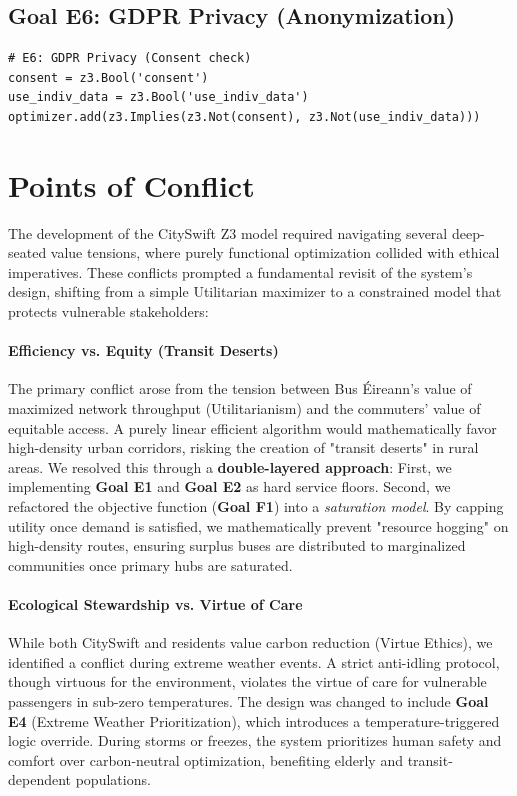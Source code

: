 \documentclass[]
{UCD_CS_41820_Report}
\begin{document}
\subsection{Goal E6: GDPR Privacy (Anonymization)}
\begin{lstlisting}[style=py]
# E6: GDPR Privacy (Consent check)
consent = z3.Bool('consent')
use_indiv_data = z3.Bool('use_indiv_data')
optimizer.add(z3.Implies(z3.Not(consent), z3.Not(use_indiv_data)))
\end{lstlisting}

\section{Points of Conflict}
The development of the CitySwift Z3 model required navigating several deep-seated value tensions, where purely functional optimization collided with ethical imperatives. These conflicts prompted a fundamental revisit of the system's design, shifting from a simple Utilitarian maximizer to a constrained model that protects vulnerable stakeholders:

\paragraph{Efficiency vs. Equity (Transit Deserts)}
The primary conflict arose from the tension between Bus Éireann's value of maximized network throughput (Utilitarianism) and the commuters' value of equitable access. A purely linear efficient algorithm would mathematically favor high-density urban corridors, risking the creation of "transit deserts" in rural areas. We resolved this through a \textbf{double-layered approach}: First, we implementing \textbf{Goal E1} and \textbf{Goal E2} as hard service floors. Second, we refactored the objective function (\textbf{Goal F1}) into a \textit{saturation model}. By capping utility once demand is satisfied, we mathematically prevent "resource hogging" on high-density routes, ensuring surplus buses are distributed to marginalized communities once primary hubs are saturated.

\paragraph{Ecological Stewardship vs. Virtue of Care}
While both CitySwift and residents value carbon reduction (Virtue Ethics), we identified a conflict during extreme weather events. A strict anti-idling protocol, though virtuous for the environment, violates the virtue of care for vulnerable passengers in sub-zero temperatures. The design was changed to include \textbf{Goal E4} (Extreme Weather Prioritization), which introduces a temperature-triggered logic override. During storms or freezes, the system prioritizes human safety and comfort over carbon-neutral optimization, benefiting elderly and transit-dependent populations.
\end{document}
